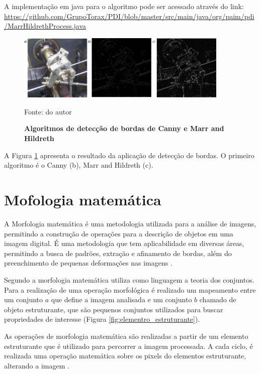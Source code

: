 \documentclass[
	12pt,				%
	oneside,			%
	a4paper,			%
	english,			%
	french,				%
	spanish,			%
	brazil,				%
	]{abntex2}
\begin{document}
A implementação em java para o algoritmo pode ser acessado através do link:
\url{https://github.com/GrupoTorax/PDI/blob/master/src/main/java/org/paim/pdi/MarrHildrethProcess.java}

\begin{figure}[ht]
\centering
\caption{\textbf{Algoritmos de detecção de bordas de Canny e Marr and Hildreth}}
\includegraphics[width=0.9\textwidth]{imagens/deteccao_bordas2.png}

Fonte: do autor
\label{fig:deteccao_bordas2}
\end{figure}

A Figura \ref{fig:deteccao_bordas2} apresenta o resultado da aplicação de detecção de bordas. O primeiro algoritmo é o  Canny (b), Marr and Hildreth (c).

\section{Mofologia matemática}

A Morfologia matemática é uma metodologia utilizada para a análise de imagens, permitindo a construção de operações para a descrição de objetos em uma imagem digital.  É uma metodologia que tem aplicabilidade em diversas áreas, permitindo a busca de padrões, extração e afinamento de bordas, além do preenchimento de pequenas deformações nas imagens \cite{pedriniSchwartz:2008}.

Segundo \citet{gonzalesWoods:2008} a morfologia matemática utiliza como linguagem a teoria dos conjuntos. Para a realização de uma operação morfológica é realizado um mapeamento entre um conjunto \(a\) que define a imagem analisada e um conjunto \(b\) chamado de objeto estruturante, que são pequenos conjuntos utilizados para buscar propriedades de interesse (Figura \ref{fig:elementro_estruturante}). 

As operações de morfologia matemática são realizadas a partir de um elemento estruturante que é utilizado para percorrer a imagem processada. A cada ciclo, é realizada uma operação matemática sobre os pixels do elementos estruturante, alterando a imagem \cite{pedriniSchwartz:2008}.
\end{document}
